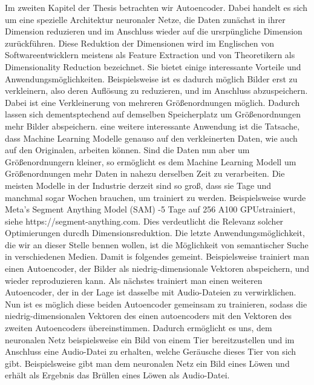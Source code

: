\documentclass[11pt, twoside, a4paper]{book}
\theoremstyle{plain}
\theoremstyle{definition}
\theoremstyle{plain}
\begin{document}
Im zweiten Kapitel der Thesis betrachten wir Autoencoder. Dabei handelt es sich um eine spezielle Architektur neuronaler Netze, die Daten zunächst in ihrer Dimension reduzieren und im Anschluss wieder auf die ursrpüngliche Dimension zurückführen. Diese Reduktion der Dimensionen wird im Englischen von Softwareentwicklern meistens als \glqq Feature Extraction\grqq{} und von Theoretikern als \glqq Dimensionality Reduction\grqq{} bezeichnet. Sie bietet einige interessante Vorteile und Anwendungsmöglichkeiten. Beispielsweise ist es dadurch möglich Bilder erst zu verkleinern, also deren Auflösung zu reduzieren, und im Anschluss abzuspeichern. Dabei ist eine Verkleinerung von mehreren Größenordnungen möglich. Dadurch lassen sich dementsptechend auf demselben Speicherplatz um Größenordnungen mehr Bilder abspeichern. eine weitere interessante Anwendung ist die Tatsache, dass Machine Learning Modelle genauso auf den \glqq verkleinerten\grqq{} Daten, wie auch auf den Originalen, arbeiten können. Sind die Daten nun aber um Größenordnungern kleiner, so ermöglicht es dem Machine Learning Modell um Größenordnungen mehr Daten in nahezu derselben Zeit zu verarbeiten. Die meisten Modelle in der Industrie derzeit sind so groß, dass sie Tage und manchmal sogar Wochen brauchen, um trainiert zu werden. Beispielsweise wurde Meta's Segment Anything Model (SAM) -5 Tage auf 256 A100 GPUs\grqq trainiert, siehe https://segment-anything.com. Dies verdeutlicht die Relevanz solcher Optimierungen durcdh Dimensionsreduktion. Die letzte Anwendungsmöglichkeit, die wir an dieser Stelle bennen wollen, ist die Möglichkeit von semantischer Suche in verschiedenen Medien. Damit is folgendes gemeint. Beispielsweise trainiert man einen Autoencoder, der Bilder als niedrig-dimensionale Vektoren abspeichern, und wieder reproduzieren kann. Als nächstes trainiert man einen weiteren Autoencoder, der in der Lage ist dasselbe mit Audio-Dateien zu verwirklichen. Nun ist es möglich diese beiden Autoencoder gemeinsam zu trainieren, sodass die niedrig-dimensionalen Vektoren des einen autoencoders mit den Vektoren des zweiten Autoencoders übereinstimmen. Dadurch ermöglicht es uns, dem neuronalen Netz beispielsweise ein Bild von einem Tier bereitzustellen und im Anschluss eine Audio-Datei zu erhalten, welche Geräusche dieses Tier von sich gibt. Beispielsweise gibt man dem neuronalen Netz ein Bild eines Löwen und erhält als Ergebnis das Brüllen eines Löwen als Audio-Datei.
\end{document}
